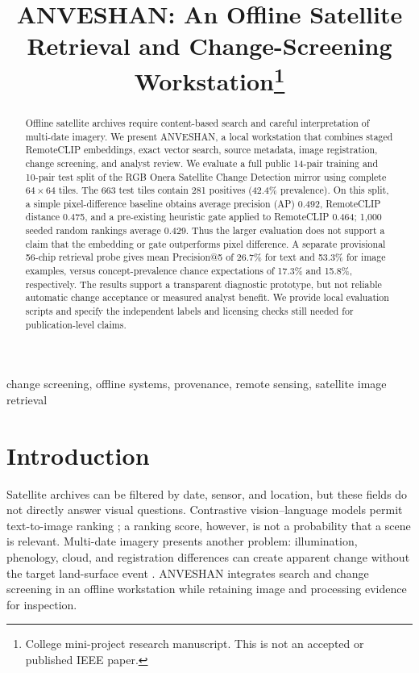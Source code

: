 \documentclass[conference,a4paper]{IEEEtran}
\title{ANVESHAN: An Offline Satellite Retrieval and Change-Screening Workstation\thanks{College mini-project research manuscript. This is not an accepted or published IEEE paper.}}
\author{\IEEEauthorblockN{Raman Pratap Singh and Rajan Nishad}
\IEEEauthorblockA{Department of Computer Science and Engineering\\
Greater Noida Institute of Technology\\Greater Noida, Uttar Pradesh, India}}
\begin{document}
\maketitle
\begin{abstract}
Offline satellite archives require content-based search and careful interpretation of multi-date imagery. We present ANVESHAN, a local workstation that combines staged RemoteCLIP embeddings, exact vector search, source metadata, image registration, change screening, and analyst review. We evaluate a full public 14-pair training and 10-pair test split of the RGB Onera Satellite Change Detection mirror using complete $64\times64$ tiles. The 663 test tiles contain 281 positives (42.4\% prevalence). On this split, a simple pixel-difference baseline obtains average precision (AP) 0.492, RemoteCLIP distance 0.475, and a pre-existing heuristic gate applied to RemoteCLIP 0.464; 1,000 seeded random rankings average 0.429. Thus the larger evaluation does not support a claim that the embedding or gate outperforms pixel difference. A separate provisional 56-chip retrieval probe gives mean Precision@5 of 26.7\% for text and 53.3\% for image examples, versus concept-prevalence chance expectations of 17.3\% and 15.8\%, respectively. The results support a transparent diagnostic prototype, but not reliable automatic change acceptance or measured analyst benefit. We provide local evaluation scripts and specify the independent labels and licensing checks still needed for publication-level claims.
\end{abstract}
\begin{IEEEkeywords}
change screening, offline systems, provenance, remote sensing, satellite image retrieval
\end{IEEEkeywords}

\section{Introduction}
Satellite archives can be filtered by date, sensor, and location, but these fields do not directly answer visual questions. Contrastive vision--language models permit text-to-image ranking \cite{radford2021clip,liu2024remoteclip}; a ranking score, however, is not a probability that a scene is relevant. Multi-date imagery presents another problem: illumination, phenology, cloud, and registration differences can create apparent change without the target land-surface event \cite{cheng2023survey,daudt2018urban}. ANVESHAN integrates search and change screening in an offline workstation while retaining image and processing evidence for inspection.
\end{document}
